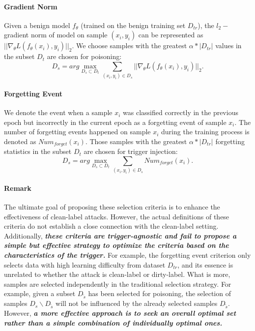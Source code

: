 \documentclass{article}
\begin{document}
\paragraph{Gradient Norm}
Given a benign model \(f_{\theta}\) (trained on the benign training set \(D_{tr}\)), the \(l_2-\) gradient norm of model on sample \((x_i,y_i)\) can be represented as \(||\nabla_{\theta} L(f_{\theta}(x_i), y_i)||_2\). We choose samples with the greatest \(\alpha*|D_{tr}|\) values in the subset \(D_t\) are chosen for
poisoning:
\begin{equation}
D_s = arg \max_{D_s\subset D_t}\sum_{(x_i,y_i) \in D_s}||\nabla_{\theta} L(f_{\theta}(x_i), y_i)||_2.
\end{equation}

\paragraph{Forgetting Event} We denote the event when a sample \(x_i\) was classified correctly in the previous epoch but incorrectly in the current epoch as a forgetting event of sample \(x_i\). The number of forgetting events happened on sample \(x_i\) during the training process is denoted as \(Num_{forget}(x_i)\). Those samples with the greatest \(\alpha*|D_{tr}|\) forgetting statistics in the subset \(D_t\) are chosen for trigger injection:
\begin{equation}
D_s = arg \max_{D_s\subset D_t}\sum_{(x_i,y_i) \in D_s}Num_{forget}(x_i).
\end{equation}

\paragraph{Remark}
The ultimate goal of proposing these selection criteria is to enhance the effectiveness of clean-label attacks. However, the actual definitions of these criteria do not establish a close connection with the clean-label setting. Additionally, \textbf{\textit{these criteria are trigger-agnostic and fail to propose a simple but effective strategy to optimize the criteria based on the characteristics of the trigger.}} For example, the forgetting event criterion only selects data with high learning difficulty from dataset \(D_{tr}\), and its essence is unrelated to whether the attack is clean-label or dirty-label. What is more, samples are selected independently in the traditional selection strategy. For example, given a subset \(D_{\tilde{s}}\) has been selected for poisoning, the selection of samples \(D_s\backslash D_{\tilde{s}}\) will not be influenced by the already selected samples \(D_{\tilde{s}}\). However, \textit{\textbf{a more effective approach is to seek an overall optimal set rather than a simple combination of individually optimal ones.}}
\end{document}
